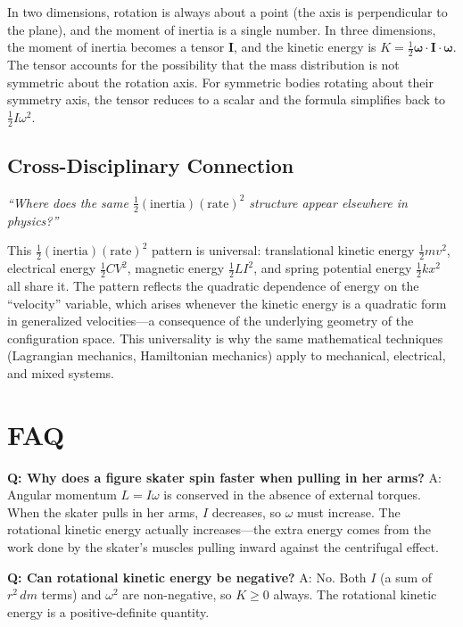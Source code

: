 In two dimensions, rotation is always about a point (the axis is perpendicular to the plane), and the moment of inertia is a single number. In three dimensions, the moment of inertia becomes a tensor $\mathbf{I}$, and the kinetic energy is $K = \frac{1}{2}\boldsymbol{\omega}\cdot\mathbf{I}\cdot\boldsymbol{\omega}$. The tensor accounts for the possibility that the mass distribution is not symmetric about the rotation axis. For symmetric bodies rotating about their symmetry axis, the tensor reduces to a scalar and the formula simplifies back to $\frac{1}{2}I\omega^2$.

\subsection*{Cross-Disciplinary Connection}
\textit{``Where does the same $\frac{1}{2}(\text{inertia})(\text{rate})^2$ structure appear elsewhere in physics?''}

This $\frac{1}{2}(\text{inertia})(\text{rate})^2$ pattern is universal: translational kinetic energy $\frac{1}{2}mv^2$, electrical energy $\frac{1}{2}CV^2$, magnetic energy $\frac{1}{2}LI^2$, and spring potential energy $\frac{1}{2}kx^2$ all share it. The pattern reflects the quadratic dependence of energy on the ``velocity'' variable, which arises whenever the kinetic energy is a quadratic form in generalized velocities---a consequence of the underlying geometry of the configuration space. This universality is why the same mathematical techniques (Lagrangian mechanics, Hamiltonian mechanics) apply to mechanical, electrical, and mixed systems.

\section*{FAQ}

\textbf{Q: Why does a figure skater spin faster when pulling in her arms?}
A: Angular momentum $L = I\omega$ is conserved in the absence of external torques. When the skater pulls in her arms, $I$ decreases, so $\omega$ must increase. The rotational kinetic energy actually increases---the extra energy comes from the work done by the skater's muscles pulling inward against the centrifugal effect.

\textbf{Q: Can rotational kinetic energy be negative?}
A: No. Both $I$ (a sum of $r^2\,dm$ terms) and $\omega^2$ are non-negative, so $K \geq 0$ always. The rotational kinetic energy is a positive-definite quantity.

